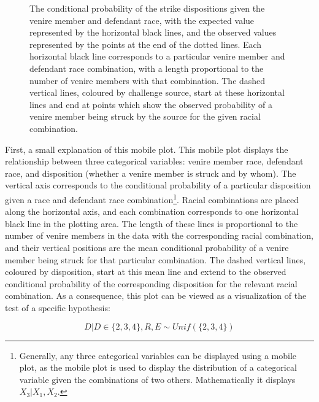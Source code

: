 \begin{figure}[!h]
  \centering
  \caption[The ``Mobile Plot'' of Strikes by Racial Combination (Sunshine)]{\footnotesize The conditional probability of the strike dispositions given the
    venire member and defendant race, with the expected value represented by the horizontal black lines, and the observed values
    represented by the points at the end of the dotted lines. Each horizontal black line corresponds to a particular venire member
    and defendant race combination, with a length proportional to the number of venire members with that combination. The dashed
    vertical lines, coloured by challenge source, start at these horizontal lines and end at points which show the observed
    probability of a venire member being struck by the source for the given racial combination.}
  \label{fig:racedefmob}
\end{figure}

First, a small explanation of this mobile plot. This mobile plot displays the relationship between three categorical variables:
venire member race, defendant race, and disposition (whether a venire member is struck and by whom). The vertical axis corresponds
to the conditional probability of a particular disposition given a race and defendant race combination\footnote{Generally, any three
  categorical variables can be displayed using a mobile plot, as the mobile plot is used to display the distribution of a
  categorical variable given the combinations of two others. Mathematically it displays $X_3|X_1,X_2$.}. Racial combinations
are placed along the horizontal axis, and each combination corresponds to one horizontal black line in the plotting area. The
length of these lines is proportional to the number of venire members in the data with the corresponding racial combination, and
their vertical positions are the mean conditional probability of a
venire member being struck for that particular combination. The dashed vertical lines, coloured by disposition, start at this mean line and
extend to the observed conditional probability of the corresponding disposition for the relevant racial combination. As a
consequence, this plot can be viewed as a visualization of the test of a specific hypothesis:

\begin{equation}
  \label{eq:vishyp}
  D | D \in \{2,3,4\}, R, E \sim Unif(\{2,3,4\})
\end{equation}

